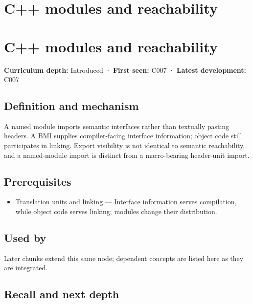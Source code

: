 \hypertarget{appendix-410a611a5b8d}{}
\section*{C++ modules and reachability}
\section{C++ modules and reachability}\label{appendix-410a611a5b8d-c-modules-and-reachability}

\textbf{Curriculum depth:} Introduced · \textbf{First seen:} C007 · \textbf{Latest development:} C007

\subsection{Definition and mechanism}\label{appendix-410a611a5b8d-definition-and-mechanism}

A named module imports semantic interfaces rather than textually pasting headers. A BMI supplies compiler-facing interface information; object code still participates in linking. Export visibility is not identical to semantic reachability, and a named-module import is distinct from a macro-bearing header-unit import.

\subsection{Prerequisites}\label{appendix-410a611a5b8d-prerequisites}

\begin{itemize}
\tightlist
\item
  \hyperref[appendix-806686359e1b]{Translation units and linking} --- Interface information serves compilation, while object code serves linking; modules change their distribution.
\end{itemize}

\subsection{Used by}\label{appendix-410a611a5b8d-used-by}

Later chunks extend this same node; dependent concepts are listed here as they are integrated.

\subsection{Recall and next depth}\label{appendix-410a611a5b8d-recall-and-next-depth}

